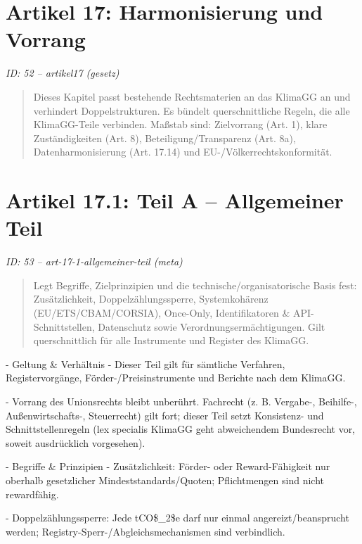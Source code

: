 \documentclass[12pt,a4paper]{scrartcl}
\begin{document}
\section[Artikel 17: Harmonisierung und Vorrang]{Artikel 17: Harmonisierung und Vorrang}
\noindent\textit{ID: 52 -- artikel17 (gesetz)}

\begin{quote}
Dieses Kapitel passt bestehende Rechtsmaterien an das KlimaGG an und verhindert Doppelstrukturen. Es bündelt querschnittliche Regeln, die alle KlimaGG-Teile verbinden. Maßstab sind: Zielvorrang (Art. 1), klare Zuständigkeiten (Art. 8), Beteiligung/Transparenz (Art. 8a), Datenharmonisierung (Art. 17.14) und EU-/Völkerrechtskonformität.
\end{quote}


\section[Artikel 17.1: Teil A -- Allgemeiner Teil]{Artikel 17.1: Teil A -- Allgemeiner Teil}
\noindent\textit{ID: 53 -- art-17-1-allgemeiner-teil (meta)}

\begin{quote}
Legt Begriffe, Zielprinzipien und die technische/organisatorische Basis fest: Zusätzlichkeit, Doppelzählungssperre, Systemkohärenz (EU/ETS/CBAM/CORSIA), Once-Only, Identifikatoren \& API-Schnittstellen, Datenschutz sowie Verordnungsermächtigungen. Gilt querschnittlich für alle Instrumente und Register des KlimaGG.
\end{quote}

- Geltung \& Verhältnis
- Dieser Teil gilt für sämtliche Verfahren, Registervorgänge, Förder-/Preis­instrumente und Berichte nach dem KlimaGG.

- Vorrang des Unionsrechts bleibt unberührt. Fachrecht (z. B. Vergabe-, Beihilfe-, Außenwirtschafts-, Steuerrecht) gilt fort; dieser Teil setzt Konsistenz- und Schnittstellenregeln (lex specialis KlimaGG geht abweichendem Bundesrecht vor, soweit ausdrücklich vorgesehen).

- Begriffe \& Prinzipien
- Zusätzlichkeit: Förder- oder Reward-Fähigkeit nur oberhalb gesetzlicher Mindeststandards/Quoten; Pflichtmengen sind nicht rewardfähig.

- Doppelzählungssperre: Jede tCO\$\_2\$e darf nur einmal angereizt/beansprucht werden; Registry-Sperr-/Abgleichsmechanismen sind verbindlich.
\end{document}
